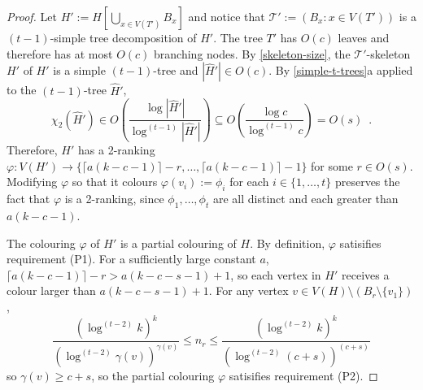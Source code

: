 \documentclass[kpfonts]{patmorin}
\newcommand{\trn}{\chi_2}
\theoremstyle{named}
\newcommand{\weirdref}[2]{\cref{#1}#2}
\begin{document}
\begin{proof}
    Let $H':=H[\bigcup_{x\in V(T')} B_x]$ and notice that $\mathcal{T}':=(B_x:x\in V(T'))$ is a $(t-1)$-simple tree decomposition of $H'$. The tree $T'$ has $O(c)$ leaves and therefore has at most $O(c)$ branching nodes. By \cref{skeleton-size}, the $\mathcal{T}'$-skeleton $\hat{H'}$ of $H'$ is a simple $(t-1)$-tree and $|\hat{H}'|\in O(c)$.  By \weirdref{simple-t-trees}{a} applied to the $(t-1)$-tree $\hat{H}'$,
    \[
       \trn(\hat{H}')\in
       O\left(\frac{\log|\hat{H}'|}{\log^{(t-1)}|\hat{H}'|}\right)
       \subseteq O\left(\frac{\log c}{\log^{(t-1)} c}\right) = O(s) \enspace .
    \]
    Therefore, $H'$ has a 2-ranking $\varphi:V(H')\to \{\lceil a(k-c-1)\rceil-r,\ldots,\lceil a(k-c-1)\rceil-1\}$ for some $r\in O(s)$. Modifying $\varphi$ so that it colours $\varphi(v_i):=\phi_i$ for each $i\in\{1,\ldots,t\}$ preserves the fact that $\varphi$ is a 2-ranking, since $\phi_1,\ldots,\phi_t$ are all distinct and each greater than $a(k-c-1)$.

    The colouring $\varphi$ of $H'$ is a partial colouring of $H$. By definition, $\varphi$ satisifies requirement (P1). For a sufficiently large constant $a$, $\lceil a(k-c-1)\rceil-r >  a(k-c-s-1)+1$, so each vertex in $H'$ receives a colour larger than $a(k-c-s-1)+1$.  For any vertex $v\in V(H)\setminus (B_r\setminus \{v_1\})$,
    \[ \frac{(\log^{(t-2)} k)^k}{(\log^{(t-2)}\gamma(v))^{\gamma(v)}}
         \le n_r
         \le \frac{(\log^{(t-2)} k)^k}{(\log^{(t-2)}(c+s))^{(c+s)}}
    \]
    so $\gamma(v)\ge c+s$, so the partial colouring $\varphi$ satisifies requirement (P2).


\end{proof}
\end{document}
